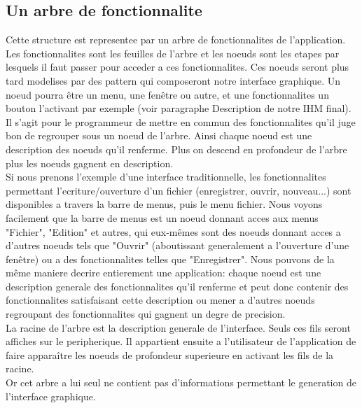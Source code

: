 \documentclass[fleqn]{article-hermes}
\begin{document}
\subsection{Un arbre de fonctionnalite}
Cette structure est representee par un arbre de fonctionnalites de l'application. Les fonctionnalites sont les feuilles de l'arbre et les noeuds sont les etapes par lesquels il faut passer pour acceder a ces fonctionnalites. Ces noeuds seront plus tard modelises par des pattern qui composeront notre interface graphique. Un noeud pourra être un menu, une fenêtre ou autre, et une fonctionnalites un bouton l'activant par exemple (voir paragraphe Description de notre IHM final).\\
Il s'agit pour le programmeur de mettre en commun des fonctionnalites qu'il juge bon de regrouper sous un noeud de l'arbre. Ainsi chaque noeud est une description des noeuds qu'il renferme. Plus on descend en profondeur de l'arbre plus les noeuds gagnent en description. \\
Si nous prenons l'exemple d'une interface traditionnelle, les fonctionnalites permettant l'ecriture/ouverture d'un fichier
(enregistrer, ouvrir, nouveau...) sont disponibles a travers la barre de menus, puis le menu fichier. Nous voyons facilement que la barre de menus est un noeud donnant acces aux menus "Fichier", "Edition" et autres, qui eux-mêmes sont des noeuds donnant acces a d'autres noeuds tels que "Ouvrir" (aboutissant generalement a l'ouverture d'une fenêtre) ou a des fonctionnalites telles que "Enregistrer". Nous pouvons de la même maniere decrire entierement une application: chaque noeud est une description generale des fonctionnalites qu'il renferme et peut donc contenir des fonctionnalites satisfaisant cette description ou mener a d'autres noeuds regroupant des fonctionnalites qui gagnent un degre de precision.\\
La racine de l'arbre est la description generale de l'interface. Seuls ces fils seront affiches sur le peripherique. Il appartient ensuite a l'utilisateur de l'application de faire apparaître les noeuds de profondeur superieure en activant les fils de la racine.\\
Or cet arbre a lui seul ne contient pas d'informations permettant le generation de l'interface graphique.
\end{document}
